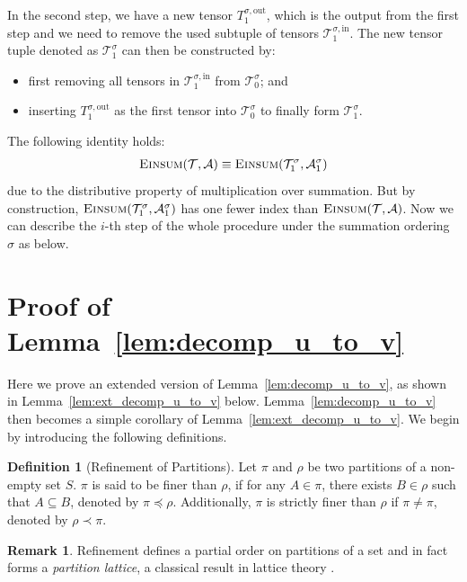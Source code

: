 \documentclass[12pt]{article}
\theoremstyle{plain}
\theoremstyle{definition}
\newtheorem{definition}{Definition}
\newtheorem{remark}{Remark}
\newcommand{\sPi}{\pi}
\newcommand{\tensorcontraction}{\textsc{Einsum}}
\newcommand{\pleq}{\preceq}
\newcommand{\pless}{\prec}
\def\calA{\mathcal{A}}
\def\calT{\mathcal{T}}
\begin{document}
\begin{bibunit}[agsm]
    In the second step, we have a new tensor $T^{\sigma,\mathrm{out}}_{1}$, which is the output from the first step and we need to remove the used subtuple of tensors $\calT^{\sigma, \mathrm{in}}_{1}$. The new tensor tuple denoted as $\calT^{\sigma}_{1}$ can then be constructed by:
    \begin{itemize}
    \item first removing all tensors in $\calT^{\sigma, \mathrm{in}}_1$ from $\calT_{0}^{\sigma}$; and
    \item inserting $T^{\sigma,\mathrm{out}}_1$ as the first tensor into $\calT_{0}^{\sigma}$ to finally form $\calT^{\sigma}_{1}$.
    \end{itemize}
    The following identity holds:
    \begin{align*}
    \tensorcontraction(\calT, \calA) \equiv \tensorcontraction(\calT^\sigma_1, \calA^\sigma_1) 
    \end{align*}
    due to the distributive property of multiplication over summation. But by construction, $\tensorcontraction(\calT^\sigma_1, \calA^\sigma_1)$ has one fewer index than $\tensorcontraction(\calT, \calA)$. 
    Now we can describe the $i$-th step of the whole procedure under the summation ordering $\sigma$ as below.
\fi


\section{Proof of Lemma~\ref{lem:decomp_u_to_v}}
\label{app:decomp_u_stats}

Here we prove an extended version of Lemma~\ref{lem:decomp_u_to_v}, as shown in Lemma~\ref{lem:ext_decomp_u_to_v} below. Lemma~\ref{lem:decomp_u_to_v} then becomes a simple corollary of Lemma~\ref{lem:ext_decomp_u_to_v}. We begin by introducing the following definitions.

\begin{definition}[Refinement of Partitions]\label{def:refinement_of_partition}
Let $\sPi$ and $\rho$ be two partitions of a non-empty set $S$. $\sPi$ is said to be finer than $\rho$, if for any $A \in \sPi$, there exists $B \in \rho$ such that $A \subseteq B$, denoted by $\sPi \pleq \rho$. Additionally, $\sPi$ is strictly finer than $\rho$ if $\sPi \neq \sPi$, denoted by $\rho \pless \sPi$. 
\end{definition}

\begin{remark}
Refinement defines a partial order on partitions of a set and in fact forms a \emph{partition lattice}, a classical result in lattice theory \citep{birkhoff1940lattice}. 
\end{remark}


\end{bibunit}
\end{document}
